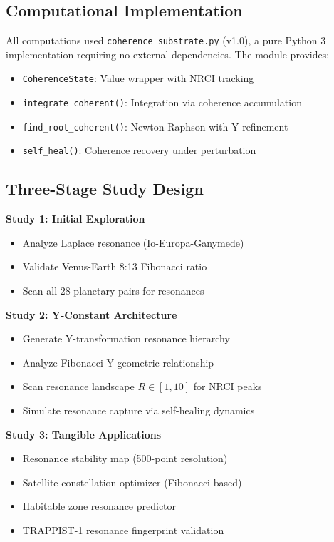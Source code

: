 \documentclass[12pt,a4paper]{article}
\begin{document}
\subsection{Computational Implementation}

All computations used \texttt{coherence\_substrate.py} (v1.0), a pure Python 3 implementation requiring no external dependencies. The module provides:

\begin{itemize}
\item \texttt{CoherenceState}: Value wrapper with NRCI tracking
\item \texttt{integrate\_coherent()}: Integration via coherence accumulation
\item \texttt{find\_root\_coherent()}: Newton-Raphson with Y-refinement
\item \texttt{self\_heal()}: Coherence recovery under perturbation
\end{itemize}

\subsection{Three-Stage Study Design}

\textbf{Study 1: Initial Exploration}
\begin{itemize}
\item Analyze Laplace resonance (Io-Europa-Ganymede)
\item Validate Venus-Earth 8:13 Fibonacci ratio
\item Scan all 28 planetary pairs for resonances
\end{itemize}

\textbf{Study 2: Y-Constant Architecture}
\begin{itemize}
\item Generate Y-transformation resonance hierarchy
\item Analyze Fibonacci-Y geometric relationship
\item Scan resonance landscape $R \in [1, 10]$ for NRCI peaks
\item Simulate resonance capture via self-healing dynamics
\end{itemize}

\textbf{Study 3: Tangible Applications}
\begin{itemize}
\item Resonance stability map (500-point resolution)
\item Satellite constellation optimizer (Fibonacci-based)
\item Habitable zone resonance predictor
\item TRAPPIST-1 resonance fingerprint validation
\end{itemize}
\end{document}

